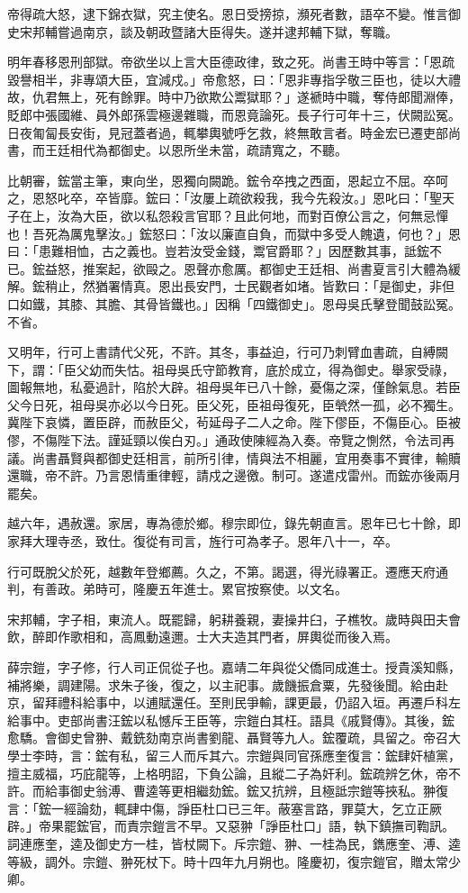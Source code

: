 \begin{pinyinscope}
{{帝得疏大怒，逮下錦衣獄，究主使名。恩日受搒掠，瀕死者數，語卒不變。惟言御史宋邦輔嘗過南京，談及朝政暨諸大臣得失。遂并逮邦輔下獄，奪職。

明年春移恩刑部獄。帝欲坐以上言大臣德政律，致之死。尚書王時中等言：「恩疏毀譽相半，非專頌大臣，宜減戍。」帝愈怒，曰：「恩非專指孚敬三臣也，徒以大禮故，仇君無上，死有餘罪。時中乃欲欺公鬻獄耶？」遂褫時中職，奪侍郎聞淵俸，貶郎中張國維、員外郎孫雲極邊雜職，而恩竟論死。長子行可年十三，伏闕訟冤。日夜匍匐長安街，見冠蓋者過，輒攀輿號呼乞救，終無敢言者。時金宏已遷吏部尚書，而王廷相代為都御史。以恩所坐未當，疏請寬之，不聽。

比朝審，鋐當主筆，東向坐，恩獨向闕跪。鋐令卒拽之西面，恩起立不屈。卒呵之，恩怒叱卒，卒皆靡。鋐曰：「汝屢上疏欲殺我，我今先殺汝。」恩叱曰：「聖天子在上，汝為大臣，欲以私怨殺言官耶？且此何地，而對百僚公言之，何無忌憚也！吾死為厲鬼擊汝。」鋐怒曰：「汝以廉直自負，而獄中多受人餽遺，何也？」恩曰：「患難相恤，古之義也。豈若汝受金錢，鬻官爵耶？」因歷數其事，詆鋐不已。鋐益怒，推案起，欲毆之。恩聲亦愈厲。都御史王廷相、尚書夏言引大體為緩解。鋐稍止，然猶署情真。恩出長安門，士民觀者如堵。皆歎曰：「是御史，非但口如鐵，其膝、其膽、其骨皆鐵也。」因稱「四鐵御史」。恩母吳氏擊登聞鼓訟冤。不省。

又明年，行可上書請代父死，不許。其冬，事益迫，行可乃刺臂血書疏，自縛闕下，謂：「臣父幼而失怙。祖母吳氏守節教育，底於成立，得為御史。舉家受祿，圖報無地，私憂過計，陷於大辟。祖母吳年已八十餘，憂傷之深，僅餘氣息。若臣父今日死，祖母吳亦必以今日死。臣父死，臣祖母復死，臣煢然一孤，必不獨生。冀陛下哀憐，置臣辟，而赦臣父，茍延母子二人之命。陛下僇臣，不傷臣心。臣被僇，不傷陛下法。謹延頸以俟白刃。」通政使陳經為入奏。帝覽之惻然，令法司再議。尚書聶賢與都御史廷相言，前所引律，情與法不相麗，宜用奏事不實律，輸贖還職，帝不許。乃言恩情重律輕，請戍之邊徼。制可。遂遣戍雷州。而鋐亦後兩月罷矣。

越六年，遇赦還。家居，專為德於鄉。穆宗即位，錄先朝直言。恩年已七十餘，即家拜大理寺丞，致仕。復從有司言，旌行可為孝子。恩年八十一，卒。

行可既脫父於死，越數年登鄉薦。久之，不第。謁選，得光祿署正。遷應天府通判，有善政。弟時可，隆慶五年進士。累官按察使。以文名。

宋邦輔，字子相，東流人。既罷歸，躬耕養親，妻操井臼，子樵牧。歲時與田夫會飲，醉即作歌相和，高鳳動遠邇。士大夫造其門者，屏輿從而後入焉。

薛宗鎧，字子修，行人司正侃從子也。嘉靖二年與從父僑同成進士。授貴溪知縣，補將樂，調建陽。求朱子後，復之，以主祀事。歲饑振倉粟，先發後聞。給由赴京，留拜禮科給事中，以逋賦還任。至則民爭輸，課更最，仍詔入垣。再遷戶科左給事中。吏部尚書汪鋐以私憾斥王臣等，宗鎧白其枉。語具《戚賢傳》。其後，鋐愈驕。會御史曾翀、戴銑劾南京尚書劉龍、聶賢等九人。鋐覆疏，具留之。帝召大學士李時，言：鋐有私，留三人而斥其六。宗鎧與同官孫應奎復言：鋐肆奸植黨，擅主威福，巧庇龍等，上格明詔，下負公論，且縱二子為奸利。鋐疏辨乞休，帝不許。而給事御史翁溥、曹逵等更相繼劾鋐。鋐又抗辨，且極詆宗鎧等挾私。翀復言：「鋐一經論劾，輒肆中傷，諍臣杜口已三年。蔽塞言路，罪莫大，乞立正厥辟。」帝果罷鋐官，而責宗鎧言不早。又惡翀「諍臣杜口」語，執下鎮撫司鞫訊。詞連應奎，逵及御史方一桂，皆杖闕下。斥宗鎧、翀、一桂為民，鐫應奎、溥、逵等級，調外。宗鎧、翀死杖下。時十四年九月朔也。隆慶初，復宗鎧官，贈太常少卿。

}}
\end{pinyinscope}

